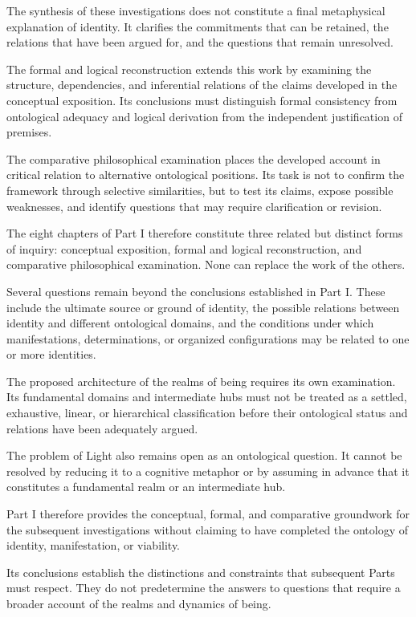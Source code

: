The synthesis of these investigations does not
constitute a final metaphysical explanation of identity.
It clarifies the commitments that can be retained,
the relations that have been argued for, and the
questions that remain unresolved.

The formal and logical reconstruction extends this
work by examining the structure, dependencies, and
inferential relations of the claims developed in
the conceptual exposition. Its conclusions must
distinguish formal consistency from ontological
adequacy and logical derivation from the independent
justification of premises.

The comparative philosophical examination places
the developed account in critical relation to
alternative ontological positions. Its task is not
to confirm the framework through selective similarities,
but to test its claims, expose possible weaknesses,
and identify questions that may require clarification
or revision.

The eight chapters of Part I therefore constitute
three related but distinct forms of inquiry:
conceptual exposition, formal and logical reconstruction,
and comparative philosophical examination. None
can replace the work of the others.

Several questions remain beyond the conclusions
established in Part I. These include the ultimate
source or ground of identity, the possible relations
between identity and different ontological domains,
and the conditions under which manifestations,
determinations, or organized configurations may
be related to one or more identities.

The proposed architecture of the realms of being
requires its own examination. Its fundamental
domains and intermediate hubs must not be treated
as a settled, exhaustive, linear, or hierarchical
classification before their ontological status and
relations have been adequately argued.

The problem of Light also remains open as an
ontological question. It cannot be resolved by
reducing it to a cognitive metaphor or by assuming
in advance that it constitutes a fundamental realm
or an intermediate hub.

Part I therefore provides the conceptual, formal,
and comparative groundwork for the subsequent
investigations without claiming to have completed
the ontology of identity, manifestation, or viability.

Its conclusions establish the distinctions and
constraints that subsequent Parts must respect.
They do not predetermine the answers to questions
that require a broader account of the realms
and dynamics of being.


